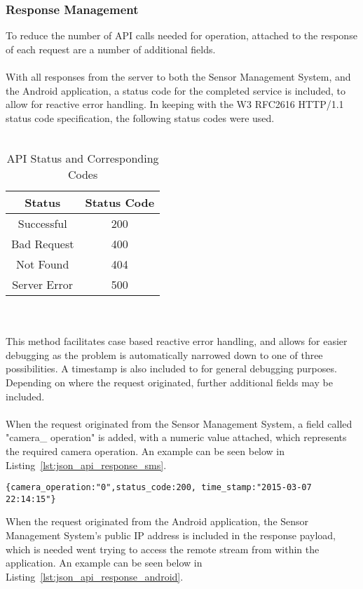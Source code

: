 \documentclass{article}
\begin{document}
\subsubsection{Response Management}
\label{sssec:api_response_mgmt}
To reduce the number of API calls needed for operation, attached to the response of each request are a number of additional fields. \\\\
With all responses from the server to both the Sensor Management System, and the Android application, a status code for the completed service is included, to allow for reactive error handling. In keeping with the W3 RFC2616 HTTP/1.1 status code specification, the following status codes were used. \\\\
\begin{table}[h!]
\begin{center}
 \begin{tabular}{|| c | c ||} 
 \hline
 Status & Status Code  \\ [0.5ex] 
 \hline\hline
 Successful & 200 \\ 
 \hline
 Bad Request & 400 \\
 \hline
 Not Found & 404 \\
 \hline
 Server Error & 500 \\ [1ex] 
 \hline
 
\end{tabular}
\end{center}
\caption{API Status and Corresponding Codes}
\end{table}
\\\\
This method facilitates case based reactive error handling, and allows for easier debugging as the problem is automatically narrowed down to one of three possibilities. A timestamp is also included to for general debugging purposes. Depending on where the request originated, further additional fields may be included. \\\\
When the request originated from the Sensor Management System, a field called "camera\_ operation" is added, with a numeric value attached, which represents the required camera operation. An example can be seen below in Listing~\ref{lst:json_api_response_sms}.
\begin{lstlisting}[caption={JSON API Response to Sensor Management System},label={lst:json_api_response_sms}]
{camera_operation:"0",status_code:200, time_stamp:"2015-03-07 22:14:15"}
\end{lstlisting}
When the request originated from the Android application, the Sensor Management System’s public IP address is included in the response payload, which is needed went trying to access the remote stream from within the application. An example can be seen below in Listing~\ref{lst:json_api_response_android}.
\end{document}
